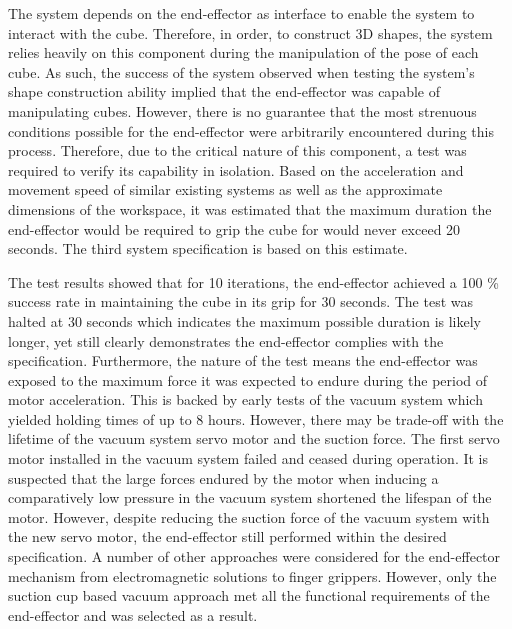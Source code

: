 The system depends on the end-effector as interface to enable the system to interact with the cube. Therefore, in order, to construct 3D shapes, the system relies heavily on this component during the manipulation of the pose of each cube. As such, the success of the system observed when testing the system's shape construction ability implied that the end-effector was capable of manipulating cubes. However, there is no guarantee that the most strenuous conditions possible for the end-effector were arbitrarily encountered during this process. Therefore, due to the critical nature of this component, a test was required to verify its capability in isolation. Based on the acceleration and movement speed of similar existing systems as well as the approximate dimensions of the workspace, it was estimated that the maximum duration the end-effector would be required to grip the cube for would never exceed 20 seconds. The third system specification is based on this estimate. 

The test results showed that for 10 iterations, the end-effector achieved a 100 \% success rate in maintaining the cube in its grip for 30 seconds. The test was halted at 30 seconds which indicates the maximum possible duration is likely longer, yet still clearly demonstrates the end-effector complies with the specification. Furthermore, the nature of the test means the end-effector was exposed to the maximum force it was expected to endure during the period of motor acceleration. This is backed by early tests of the vacuum system which yielded holding times of up to 8 hours. However, there may be trade-off with the lifetime of the vacuum system servo motor and the suction force. The first servo motor installed in the vacuum system failed and ceased during operation. It is suspected that the large forces endured by the motor when inducing a comparatively low pressure in the vacuum system shortened the lifespan of the motor. However, despite reducing the suction force of the vacuum system with the new servo motor, the end-effector still performed within the desired specification. A number of other approaches were considered for the end-effector mechanism from electromagnetic solutions to finger grippers. However, only the suction cup based vacuum approach met all the functional requirements of the end-effector and was selected as a result.


